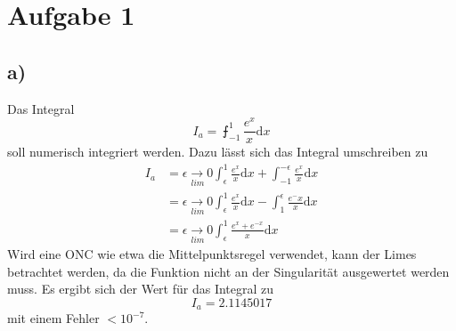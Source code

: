 \section*{Aufgabe 1}
\subsection*{a)} 
Das Integral
\[
I_a = \intbar_{-1}^1 \frac{e^x}{x}\mathrm{d}x
\]
soll numerisch integriert werden.
Dazu lässt sich das Integral umschreiben zu
\begin{align*}
I_a &= \underset{lim}{\epsilon\rightarrow 0}\int_{\epsilon}^1\frac{e^x}{x}\mathrm{d}x + \int_{-1}^{-\epsilon}\frac{e^x}{x}\mathrm{d}x\\
&=\underset{lim}{\epsilon\rightarrow 0}\int_{\epsilon}^1\frac{e^x}{x}\mathrm{d}x - \int_{1}^{\epsilon}\frac{e^-x}{x}\mathrm{d}x\\
&=\underset{lim}{\epsilon\rightarrow 0}\int_{\epsilon}^1\frac{e^x+e^{-x}}{x}\mathrm{d}x
\end{align*}
Wird eine ONC wie etwa die Mittelpunktsregel verwendet, kann der Limes betrachtet werden, da die Funktion nicht an der Singularität ausgewertet werden muss. Es ergibt sich der Wert für das Integral zu
\[
I_a = 2.1145017
\]
mit einem Fehler $<10^{-7}$.
